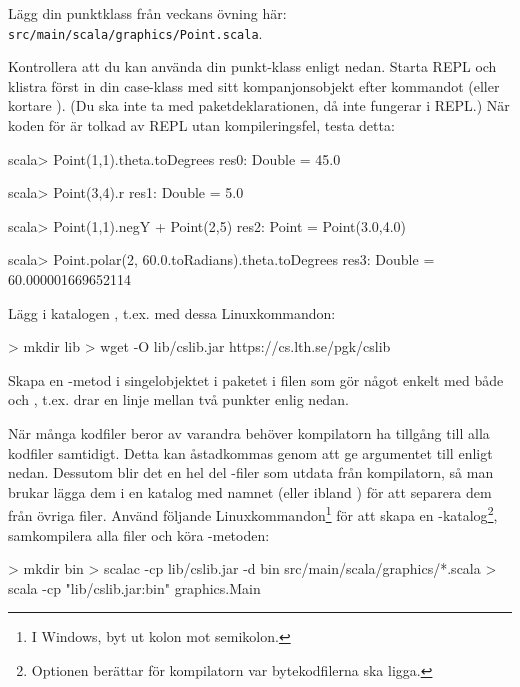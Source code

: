 \Task Lägg din punktklass från veckans övning här:\\ \texttt{src/main/scala/graphics/Point.scala}.

Kontrollera att du kan använda din punkt-klass enligt nedan. Starta REPL och klistra först in din case-klass med sitt kompanjonsobjekt efter kommandot  (eller kortare ). (Du ska inte ta med paketdeklarationen, då  inte fungerar i REPL.) När koden för  är tolkad av REPL utan kompileringsfel, testa detta:
\begin{REPLnonum}
scala> Point(1,1).theta.toDegrees
res0: Double = 45.0

scala> Point(3,4).r
res1: Double = 5.0

scala> Point(1,1).negY + Point(2,5)
res2: Point = Point(3.0,4.0)

scala> Point.polar(2, 60.0.toRadians).theta.toDegrees
res3: Double = 60.000001669652114
\end{REPLnonum}


\Task Lägg  i katalogen , t.ex. med dessa Linuxkommandon:
\begin{REPLnonum}
> mkdir lib
> wget -O lib/cslib.jar https://cs.lth.se/pgk/cslib
\end{REPLnonum}

\Task Skapa en -metod i singelobjektet  i paketet  i filen 
som gör något enkelt med både  och , t.ex. drar en linje mellan två punkter enlig nedan.

\noindent När många kodfiler beror av varandra behöver kompilatorn ha tillgång till alla kodfiler samtidigt.  Detta kan åstadkommas genom att ge argumentet  till  enligt nedan. Dessutom blir det en hel del -filer som utdata från kompilatorn, så man brukar lägga dem i en katalog med namnet  (eller ibland ) för att separera dem från övriga filer.
Använd följande Linuxkommandon\footnote{I Windows, byt ut kolon mot semikolon.} för att skapa en -katalog\footnote{Optionen  berättar för kompilatorn var bytekodfilerna ska ligga.}, samkompilera alla filer och köra -metoden:
\begin{REPLnonum}
> mkdir bin
> scalac -cp lib/cslib.jar -d bin src/main/scala/graphics/*.scala
> scala -cp "lib/cslib.jar:bin" graphics.Main
\end{REPLnonum}


